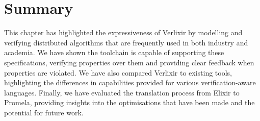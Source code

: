\section{Summary}
This chapter has highlighted the expressiveness of Verlixir by modelling and verifying distributed algorithms that are frequently used in both industry and academia. We have shown the toolchain is capable of supporting these specifications, verifying properties over them and providing clear feedback when properties are violated. We have also compared Verlixir to existing tools, highlighting the differences in capabilities provided for various verification-aware languages. Finally, we have evaluated the translation process from Elixir to Promela, providing insights into the optimisations that have been made and the potential for future work.